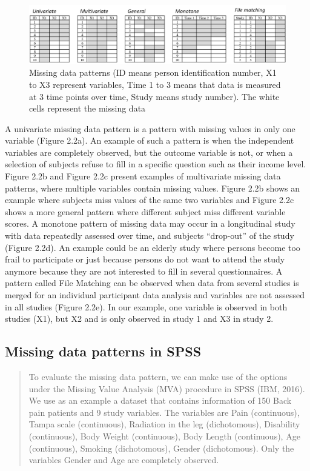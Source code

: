 \documentclass[]{book}
\begin{document}
\begin{figure}

{\centering \includegraphics[width=0.9\linewidth]{images/fig2.2} 

}

\caption{Missing data patterns (ID means person identification number, X1 to X3 represent variables, Time 1 to 3 means that data is measured at 3 time points over time, Study means study number). The white cells represent the missing data}\label{fig:fig28}
\end{figure}

A univariate missing data pattern is a pattern with missing values in
only one variable (Figure 2.2a). An example of such a pattern is when
the independent variables are completely observed, but the outcome
variable is not, or when a selection of subjects refuse to fill in a
specific question such as their income level. Figure 2.2b and Figure
2.2c present examples of multivariate missing data patterns, where
multiple variables contain missing values. Figure 2.2b shows an example
where subjects miss values of the same two variables and Figure 2.2c
shows a more general pattern where different subject miss different
variable scores. A monotone pattern of missing data may occur in a
longitudinal study with data repeatedly assessed over time, and subjects
``drop-out'' of the study (Figure 2.2d). An example could be an elderly
study where persons become too frail to participate or just because
persons do not want to attend the study anymore because they are not
interested to fill in several questionnaires. A pattern called File
Matching can be observed when data from several studies is merged for an
individual participant data analysis and variables are not assessed in
all studies (Figure 2.2e). In our example, one variable is observed in
both studies (X1), but X2 and is only observed in study 1 and X3 in
study 2.

\subsection{Missing data patterns in
SPSS}\label{missing-data-patterns-in-spss}

\begin{quote}
To evaluate the missing data pattern, we can make use of the options
under the Missing Value Analysis (MVA) procedure in SPSS (IBM, 2016). We
use as an example a dataset that contains information of 150 Back pain
patients and 9 study variables. The variables are Pain (continuous),
Tampa scale (continuous), Radiation in the leg (dichotomous), Disability
(continuous), Body Weight (continuous), Body Length (continuous), Age
(continuous), Smoking (dichotomous), Gender (dichotomous). Only the
variables Gender and Age are completely observed.
\end{quote}
\end{document}
